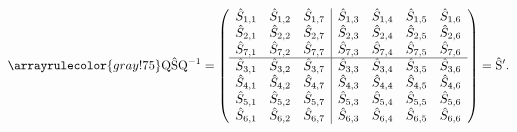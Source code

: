 \begin{equation}
    \arrayrulecolor{gray!75}
    \matr{Q} \matrcp{S} \matr{Q}^{-1}
    =
    \left(
        \begin{array}{ccc|cccc}
        \cp{S}_{1,1} & \cp{S}_{1,2} & \cp{S}_{1,7} & \cp{S}_{1,3} & \cp{S}_{1,4} & \cp{S}_{1,5} & \cp{S}_{1,6} \\
        \cp{S}_{2,1} & \cp{S}_{2,2} & \cp{S}_{2,7} & \cp{S}_{2,3} & \cp{S}_{2,4} & \cp{S}_{2,5} & \cp{S}_{2,6} \\
        \cp{S}_{7,1} & \cp{S}_{7,2} & \cp{S}_{7,7} & \cp{S}_{7,3} & \cp{S}_{7,4} & \cp{S}_{7,5} & \cp{S}_{7,6} \\
        \hline
        \cp{S}_{3,1} & \cp{S}_{3,2} & \cp{S}_{3,7} & \cp{S}_{3,3} & \cp{S}_{3,4} & \cp{S}_{3,5} & \cp{S}_{3,6} \\
        \cp{S}_{4,1} & \cp{S}_{4,2} & \cp{S}_{4,7} & \cp{S}_{4,3} & \cp{S}_{4,4} & \cp{S}_{4,5} & \cp{S}_{4,6} \\
        \cp{S}_{5,1} & \cp{S}_{5,2} & \cp{S}_{5,7} & \cp{S}_{5,3} & \cp{S}_{5,4} & \cp{S}_{5,5} & \cp{S}_{5,6} \\
        \cp{S}_{6,1} & \cp{S}_{6,2} & \cp{S}_{6,7} & \cp{S}_{6,3} & \cp{S}_{6,4} & \cp{S}_{6,5} & \cp{S}_{6,6} \\
        \end{array}
    \right)
    =
    \matrcp{S}'
    \text{.}
    \label{eq:q_s_qtranspose_sprime}
\end{equation}

